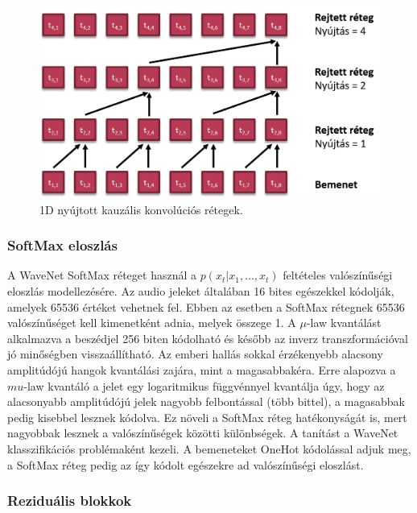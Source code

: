 \begin{figure}[!ht]
	\centering
	\includegraphics[width=150mm, keepaspectratio]{figures/1d-dilated-conv.png}
	\caption{1D nyújtott kauzális konvolúciós rétegek.}
	\label{fig:1d_dilated_conv}
\end{figure}

\subsubsection{SoftMax eloszlás}
A WaveNet SoftMax réteget használ a $p(x_t|x_1,\dots,x_t)$ feltételes valószínűségi eloszlás modellezésére.
Az audio jeleket általában 16 bites egészekkel kódolják, amelyek 65536 értéket vehetnek fel. Ebben az esetben a SoftMax rétegnek 65536 valószínűséget kell kimenetként adnia, melyek összege 1. A $\mu$-law kvantálást alkalmazva a beszédjel 256 biten kódolható és később az inverz transzformációval jó minőségben visszaállítható.
\newline
\newline
Az emberi hallás sokkal érzékenyebb alacsony amplitúdójú hangok kvantálási zajára, mint a magasabbakéra. Erre alapozva a $mu$-law kvantáló a jelet egy logaritmikus függvénnyel kvantálja úgy, hogy az alacsonyabb amplitúdójú jelek nagyobb felbontással (több bittel), a magasabbak pedig kisebbel lesznek kódolva. Ez növeli a SoftMax réteg hatékonyságát is, mert nagyobbak lesznek a valószínűségek közötti különbségek.
\newline
\newline
A tanítást a WaveNet klasszifikációs problémaként kezeli. A bemeneteket OneHot kódolással adjuk meg, a SoftMax réteg pedig az így kódolt egészekre ad valószínűségi eloszlást.

\subsubsection{Reziduális blokkok}

